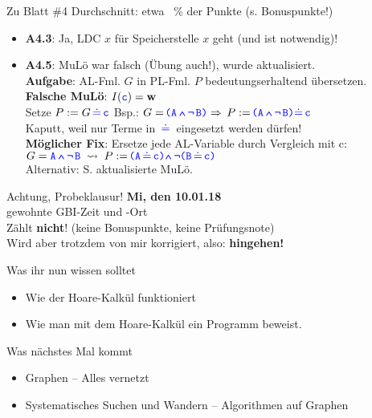 \begin{frame}{Zu Blatt \#4}
	Durchschnitt: \quad etwa ~\% der Punkte (s. Bonuspunkte!)
	\begin{itemize}
		\item \textbf{A4.3}: Ja, LDC $x$ für Speicherstelle $x$ geht (und ist notwendig)!
		\item \textbf{A4.5}: MuLö war falsch (Übung auch!), wurde aktualisiert. \\
			  \textbf{Aufgabe}: \; AL-Fml. $G$ in PL-Fml. $P$ bedeutungserhaltend übersetzen. \\ 
			  \pause
			  \textbf{Falsche MuLö}: \; $I(\hbox{\textcolor{blue}{\texttt{c}}}) = \hbox{\textbf{w}}$ \\
			  \quad Setze $P := G \pleq \word c$ \qquad Bsp.: \; $G = \plka \word A \aland \alnot \word B \plkz \impl P := \plka \word A \aland \alnot \word B \plkz \pleq \word c$ \\ 
				  \pause 
				  \quad \impl Kaputt, weil nur Terme in $\pleq$ eingesetzt werden dürfen! \\
			  \pause
			  \textbf{Möglicher Fix}: \; Ersetze jede AL-Variable durch Vergleich mit \word c: \\
			  \quad $G = \word A \aland \alnot \word B \; \?> \; P := \plka \word A \pleq \word c\plkz \aland \alnot \plka \word B \pleq \word c\plkz$ \\
			  Alternativ: S. aktualisierte MuLö.
	\end{itemize}
\end{frame}

\begin{frame}{Achtung, Probeklausur!}
	\textbf{Mi, den 10.01.18} \\
	gewohnte GBI-Zeit und -Ort \\
	Zählt \textbf{nicht}! {\small (keine Bonuspunkte, keine Prüfungsnote)}\\
	Wird aber trotzdem von mir korrigiert, also: \textbf{hingehen!} \smiley
\end{frame}



\begin{frame}	
	\begin{block}{Was ihr nun wissen solltet}
		\begin{itemize}
			\item Wie der Hoare-Kalkül funktioniert
			\item Wie man mit dem Hoare-Kalkül ein Programm beweist.
		\end{itemize}
	\end{block}
	
	\begin{block}{Was nächstes Mal kommt}
		\begin{itemize}
			\item Graphen -- Alles vernetzt
			\item Systematisches Suchen und Wandern -- Algorithmen auf Graphen
		\end{itemize}
	\end{block}
\end{frame}

\slideThanks

